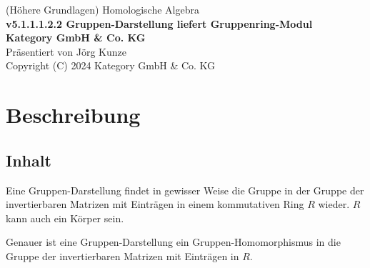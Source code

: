 \documentclass[a4paper]{amsart}
\theoremstyle{definition}
\begin{document}
\begin{titlepage}
\centering
{\huge
(Höhere Grundlagen) Homologische Algebra\\[1cm]
\textbf{v5.1.1.1.2.2 Gruppen-Darstellung liefert Gruppenring-Modul}
}\\[1cm]

\textbf{Kategory GmbH \& Co. KG}\\
Präsentiert von Jörg Kunze\\
Copyright (C) 2024 Kategory GmbH \& Co. KG

\end{titlepage}

%

\newpage

\section*{Beschreibung}

\subsection*{Inhalt}
Eine Gruppen-Darstellung findet in gewisser Weise die Gruppe in der Gruppe der invertierbaren Matrizen mit Einträgen in einem kommutativen Ring $R$ wieder. $R$ kann auch ein Körper sein.

Genauer ist eine Gruppen-Darstellung ein Gruppen-Homomorphismus in die Gruppe der invertierbaren Matrizen mit Einträgen in $R$.
\end{document}
